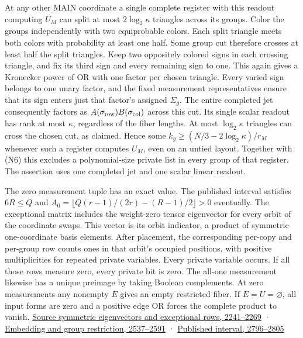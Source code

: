 \documentclass[
  11pt,
]{article}
\begin{document}
At any other MAIN coordinate a single complete register with this
readout computing \(U_M\) can split at most \(2\log_2\kappa\) triangles
across its groups. Color the groups independently with two equiprobable
colors. Each split triangle meets both colors with probability at least
one half. Some group cut therefore crosses at least half the split
triangles. Keep two oppositely colored signs in each crossing triangle,
and fix its third sign and every remaining sign to one. This again gives
a Kronecker power of OR with one factor per chosen triangle. Every
varied sign belongs to one unary factor, and the fixed measurement
representatives ensure that its sign enters just that factor's assigned
\(\Sigma_g\). The entire completed jet consequently factors as
\(A(\sigma_{\rm row})B(\sigma_{\rm col})\) across this cut. Its single
scalar readout has rank at most \(\kappa\), regardless of the fiber
lengths. At most \(\log_2\kappa\) triangles can cross the chosen cut, as
claimed. Hence some \(k_g\ge (N/3-2\log_2\kappa)/r_M\) whenever such a
register computes \(U_M\), even on an untied layout. Together with (N6)
this excludes a polynomial-size private list in every group of that
register. The assertion uses one completed jet and one scalar linear
readout.

The zero measurement tuple has an exact value. The published interval
satisfies \(6R\le Q\) and \(A_0=\lfloor Q(r-1)/(2r)-(R-1)/2\rfloor>0\)
eventually. The exceptional matrix includes the weight-zero tensor
eigenvector for every orbit of the coordinate swaps. This vector is its
orbit indicator, a product of symmetric one-coordinate basis elements.
After placement, the corresponding per-copy and per-group row counts
ones in that orbit's occupied positions, with positive multiplicities
for repeated private variables. Every private variable occurs. If all
those rows measure zero, every private bit is zero. The all-one
measurement likewise has a unique preimage by taking Boolean
complements. At zero measurements any nonempty \(E\) gives an empty
restricted fiber. If \(E=U=\varnothing\), all input forms are zero and a
positive edge OR forces the complete product to vanish.
\href{https://github.com/openai/math/blob/main/preprints/The-Exponential-Time-Hypothesis-is-False-October-25-2026/build/main_full_version.tex\#L2241}{Source
symmetric eigenvectors and exceptional rows, 2241--2269} ·
\href{https://github.com/openai/math/blob/main/preprints/The-Exponential-Time-Hypothesis-is-False-October-25-2026/build/main_full_version.tex\#L2537}{Embedding
and group restriction, 2537--2591} ·
\href{https://github.com/openai/math/blob/main/preprints/The-Exponential-Time-Hypothesis-is-False-October-25-2026/build/main_full_version.tex\#L2796}{Published
interval, 2796--2805}
\end{document}
